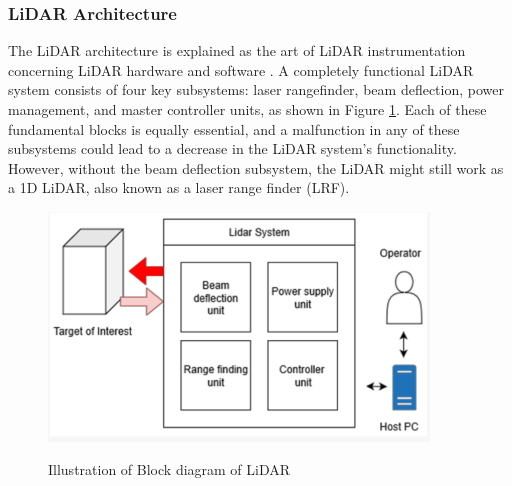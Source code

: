 \subsubsection{LiDAR Architecture}
\noindent The LiDAR architecture is explained as the art of LiDAR instrumentation concerning LiDAR hardware and software \cite{FundamentalsofLidarRemoteSensing, PhysicalPictureofLidarEquation}.
A completely functional LiDAR system consists of four key subsystems: laser rangefinder, beam deflection, power management, and master controller units, as shown in Figure \ref{fig:Block diagram of LiDAR}. 
Each of these fundamental blocks is equally essential, and a malfunction in any of these subsystems could lead to a decrease in the LiDAR system’s functionality. However, without the beam deflection subsystem, the LiDAR might still work as a 1D LiDAR, also known as a laser range finder (LRF)\cite{raj2020survey}.

\begin{figure}[H]
  \centering
  \includegraphics[width=0.9\textwidth]{Figures/Block diagram of LiDAR system.PNG}
  \caption[Illustration Block diagram of LiDAR]{Illustration of Block diagram of LiDAR} \cite{raj2020survey}
  \label{fig:Block diagram of LiDAR}
\end{figure}

